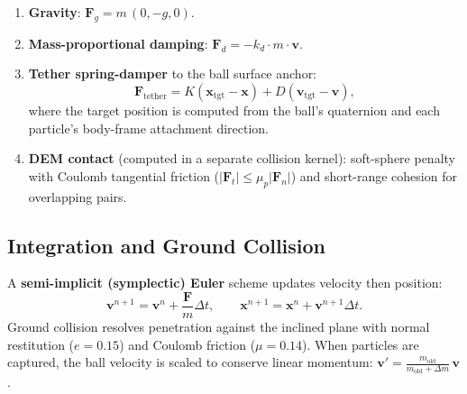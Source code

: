 \begin{enumerate}
  \item \textbf{Gravity}: $\mathbf{F}_g = m\,(0, -g, 0)$.
  \item \textbf{Mass-proportional damping}: $\mathbf{F}_d = -k_d \cdot m
        \cdot \mathbf{v}$.
  \item \textbf{Tether spring-damper} to the ball surface anchor:
        \begin{equation}
          \mathbf{F}_{\text{tether}} = K(\mathbf{x}_{\text{tgt}} - \mathbf{x})
          + D(\mathbf{v}_{\text{tgt}} - \mathbf{v}),
          \label{eq:tether}
        \end{equation}
        where the target position is computed from the ball's quaternion
        and each particle's body-frame attachment direction.
  \item \textbf{DEM contact} (computed in a separate collision kernel):
        soft-sphere penalty with Coulomb tangential friction
        ($|\mathbf{F}_t| \leq \mu_p |\mathbf{F}_n|$) and short-range
        cohesion for overlapping pairs.
\end{enumerate}

\subsection{Integration and Ground Collision}
\label{sec:integration}

A \textbf{semi-implicit (symplectic) Euler} scheme updates velocity then
position:
%
\begin{equation}
  \mathbf{v}^{n+1} = \mathbf{v}^n + \frac{\mathbf{F}}{m}\Delta t, \qquad
  \mathbf{x}^{n+1} = \mathbf{x}^n + \mathbf{v}^{n+1}\Delta t.
  \label{eq:euler}
\end{equation}
%
Ground collision resolves penetration against the inclined plane with normal
restitution ($e = 0.15$) and Coulomb friction ($\mu = 0.14$). When particles
are captured, the ball velocity is scaled to conserve linear momentum:
$\mathbf{v}' = \frac{m_{\text{old}}}{m_{\text{old}} + \Delta m}\,\mathbf{v}$.
